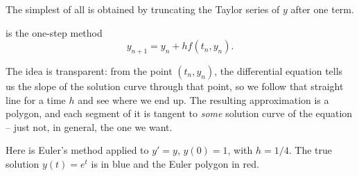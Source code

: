 \documentclass[a4paper]{scrartcl}
\begin{document}
The simplest of all is obtained by truncating the Taylor series of $y$ after one term.

\begin{definition}
   is the one-step method
  $$
  y_{n+1} = y_n + hf(t_n, y_n).
  $$
\end{definition}

The idea is transparent: from the point $(t_n, y_n)$, the differential equation tells us the slope of the solution curve through that point, so we follow that straight line for a time $h$ and see where we end up. The resulting approximation is a polygon, and each segment of it is tangent to \emph{some} solution curve of the equation -- just not, in general, the one we want.

Here is Euler's method applied to $y' = y$, $y(0) = 1$, with $h = 1/4$. The true solution $y(t) = e^t$ is in blue and the Euler polygon in red.
\end{document}
